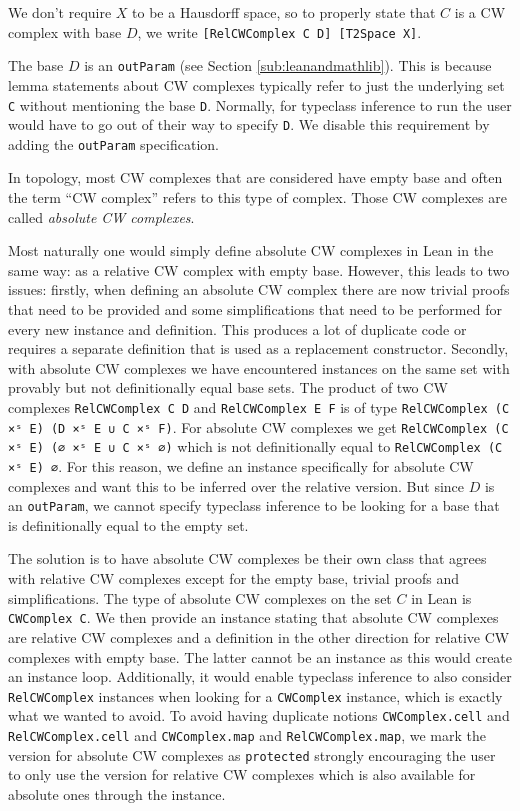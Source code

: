 We don't require $X$ to be a Hausdorff space, so to properly state that $C$ is a CW complex with base $D$, we write \lstinline|[RelCWComplex C D] [T2Space X]|.

The base $D$ is an \lstinline|outParam| (see Section \ref{sub:leanandmathlib}). 
This is because lemma statements about CW complexes typically refer to just the underlying set \lstinline|C| without mentioning the base \lstinline|D|. 
Normally, for typeclass inference to run the user would have to go out of their way to specify \lstinline|D|. 
We disable this requirement by adding the \lstinline|outParam| specification.

In topology, most CW complexes that are considered have empty base and often the term ``CW complex'' refers to this type of complex. 
Those CW complexes are called \emph{absolute CW complexes}. 

Most naturally one would simply define absolute CW complexes in Lean in the same way: as a relative CW complex with empty base.
However, this leads to two issues: 
firstly, when defining an absolute CW complex there are now trivial proofs that need to be provided and some simplifications that need to be performed for every new instance and definition. 
This produces a lot of duplicate code or requires a separate definition that is used as a replacement constructor. 
Secondly, with absolute CW complexes we have encountered instances on the same set with provably but not definitionally equal base sets. 
The product of two CW complexes \lstinline|RelCWComplex C D| and \lstinline|RelCWComplex E F| is of type \lstinline|RelCWComplex (C ×ˢ E) (D ×ˢ E ∪ C ×ˢ F)|. 
For absolute CW complexes we get \lstinline|RelCWComplex (C ×ˢ E) (∅ ×ˢ E ∪ C ×ˢ ∅)| which is not definitionally equal to \lstinline|RelCWComplex (C ×ˢ E) ∅|.
For this reason, we define an instance specifically for absolute CW complexes and want this to be inferred over the relative version. 
But since $D$ is an \lstinline|outParam|, we cannot specify typeclass inference to be looking for a base that is definitionally equal to the empty set. 

The solution is to have absolute CW complexes be their own class that agrees with relative CW complexes except for the empty base, trivial proofs and simplifications. 
The type of absolute CW complexes on the set $C$ in Lean is \lstinline|CWComplex C|. 
We then provide an instance stating that absolute CW complexes are relative CW complexes and a definition in the other direction for relative CW complexes with empty base.
The latter cannot be an instance as this would create an instance loop.
Additionally, it would enable typeclass inference to also consider \lstinline|RelCWComplex| instances when looking for a \lstinline|CWComplex| instance, which is exactly what we wanted to avoid.
To avoid having duplicate notions \lstinline|CWComplex.cell| and \lstinline|RelCWComplex.cell| and \lstinline|CWComplex.map| and \lstinline|RelCWComplex.map|, we mark the version for absolute CW complexes as \lstinline|protected| strongly encouraging the user to only use the version for relative CW complexes which is also available for absolute ones through the instance.

